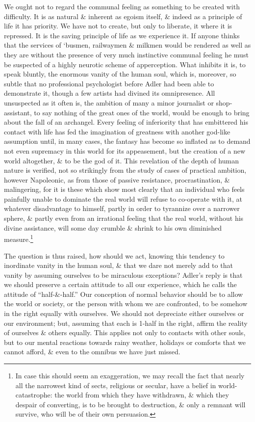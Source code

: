 \documentclass{article}
\begin{document}
We ought not to regard the communal feeling as something to be created with difficulty. It is as natural \& inherent as egoism itself, \& indeed as a principle of life it has priority. We have not to create, but only to liberate, it where it is repressed. It is the saving principle of life as we experience it. If anyone thinks that the services of `busmen, railwaymen \& milkmen would be rendered as well as they are without the presence of very much instinctive communal feeling he must be suspected of a highly neurotic scheme of apperception. What inhibits it is, to speak bluntly, the enormous vanity of the human soul, which is, moreover, so subtle that no professional psychologist before Adler had been able to demonstrate it, though a few artists had divined its omnipresence. All unsuspected as it often is, the ambition of many a minor journalist or shop-assistant, to say nothing of the great ones of the world, would be enough to bring about the fall of an archangel. Every feeling of inferiority that has embittered his contact with life has fed the imagination of greatness with another god-like assumption until, in many cases, the fantasy has become so inflated as to demand not even supremacy in this world for its appeasement, but the creation of a new world altogether, \& to be the god of it. This revelation of the depth of human nature is verified, not so strikingly from the study of cases of practical ambition, however Napoleonic, as from those of passive resistance, procrastination, \& malingering, for it is these which show most clearly that an individual who feels painfully unable to dominate the real world will refuse to co-operate with it, at whatever disadvantage to himself, partly in order to tyrannize over a narrower sphere, \& partly even from an irrational feeling that the real world, without his divine assistance, will some day crumble \& shrink to his own diminished measure.\footnote{In case this should seem an exaggeration, we may recall the fact that nearly all the narrowest kind of sects, religious or secular, have a belief in world-catastrophe: the world from which they have withdrawn, \& which they despair of converting, is to be brought to destruction, \& only a remnant will survive, who will be of their own persuasion.}

The question is thus raised, how should we act, knowing this tendency to inordinate vanity in the human soul, \& that we dare not merely add to that vanity by assuming ourselves to be miraculous exceptions? Adler's reply is that we should preserve a certain attitude to all our experience, which he calls the attitude of ``half-\&-half.'' Our conception of normal behavior should be to allow the world or society, or the person with whom we are confronted, to be somehow in the right equally with ourselves. We should not depreciate either ourselves or our environment; but, assuming that each is 1-half in the right, affirm the reality of ourselves \& others equally. This applies not only to contacts with other souls, but to our mental reactions towards rainy weather, holidays or comforts that we cannot afford, \& even to the omnibus we have just missed.
\end{document}
